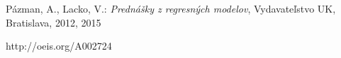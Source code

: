 \begin{thebibliography}{99}

	 Pázman, A., Lacko, V.: {\it Prednášky z regresných modelov}, Vydavateľstvo UK, Bratislava, 2012, 2015

	 http://oeis.org/A002724

\end{thebibliography}
